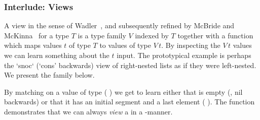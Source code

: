 \subsubsection{Interlude: Views}

A view
in the sense of Wadler~\cite{DBLP:conf/popl/Wadler87},
and subsequently refined by McBride and McKinna~\cite{DBLP:journals/jfp/McBrideM04}
for a type $T$ is a type family $V$ indexed by $T$ together
with a function which maps values $t$ of type $T$ to values of type
$V\,t$.
%
By inspecting the $V\,t$ values we can learn something about the
$t$ input.
%
The prototypical example is perhaps the `snoc` (`cons' backwards) view
of right-nested lists as if they were left-nested.
We present the  family below.


By matching on a value of type
( ) we get to learn
either that  is empty (, nil backwards)
or that it has an initial segment  and a last element
 ( \IdrisData{:<} ).
%
The function  demonstrates that we can always
\emph{view} a  in a -manner.

